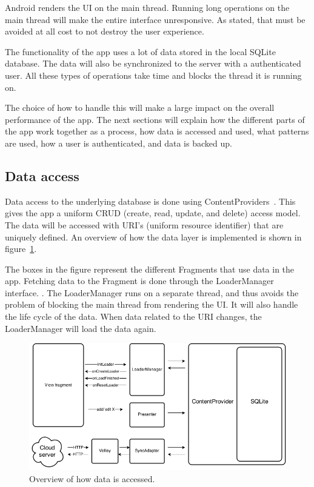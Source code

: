 Android renders the UI on the main thread. Running long operations on the main thread will make the entire interface unresponsive. As stated, that must be avoided at all cost to not destroy the user experience. 

The functionality of the app uses a lot of data stored in the local SQLite database. The data will also be synchronized to the server with a authenticated user. All these types of operations take time and blocks the thread it is running on.

The choice of how to handle this will make a large impact on the overall performance of the app. The next sections will explain how the different parts of the app work together as a process, how data is accessed and used, what patterns are used, how a user is authenticated, and data is backed up.


\subsection{Data access}
Data access to the underlying database is done using ContentProviders~\cite{contentproviders}. This gives the app a uniform \gls{CRUD} (create, read, update, and delete) access model. The data will be accessed with \gls{URI}'s (uniform resource identifier) that are uniquely defined. An overview of how the data layer is implemented is shown in figure~\ref{fig:archAppOverview}.

The boxes in the figure represent the different Fragments that use data in the app. Fetching data to the Fragment is done through the LoaderManager~\cite{loadermanager} interface. . The LoaderManager runs on a separate thread, and thus avoids the problem of blocking the main thread from rendering the UI. It will also handle the life cycle of the data. When data related to the URI changes, the LoaderManager will load the data again. 

\begin{figure}[H]
\includegraphics[width=\textwidth]{ch/architecture/fig/arch_app_overview.png}
\caption{Overview of how data is accessed.}
\label{fig:archAppOverview}
\end{figure}

